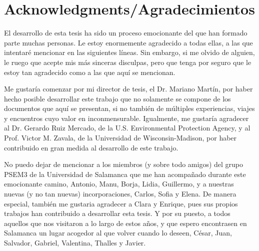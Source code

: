



\bigskip

\begingroup
\let\clearpage\relax
\let\cleardoublepage\relax
\let\cleardoublepage\relax
\chapter*{Acknowledgments/Agradecimientos}
El desarrollo de esta tesis ha sido un proceso emocionante del que han formado parte muchas personas. Le estoy enormemente agradecido a todas ellas, a las que intentaré mencionar en las siguientes l\'{i}neas. Sin embargo, si me olvido de alguien, le ruego que acepte mis m\'{a}s sinceras disculpas, pero que tenga por seguro que le estoy tan agradecido como a las que aquí se mencionan.

Me gustaría comenzar por mi director de tesis, el Dr. Mariano Martín, por haber hecho posible desarrollar este trabajo que no solamente se compone de los documentos que aqu\'{i} se presentan, si no también de m\'{u}ltiples experiencias, viajes y encuentros cuyo valor en inconmensurable. Igualmente, me gustaría agradecer al Dr. Gerardo Ruiz Mercado, de la U.S. Environmental Protection Agency, y al Prof. Victor M. Zavala, de la Universidad de Wisconsin-Madison, por haber contribuido en gran medida al desarrollo de este trabajo.

No puedo dejar de mencionar a los miembros (y sobre todo amigos) del grupo PSEM3 de la Universidad de Salamanca que me han acompañado durante este emocionante camino, Antonio, Manu, Borja, Lidia, Guillermo, y a nuestras nuevas (y no tan nuevas) incorporaciones, Carlos, Sofia y Elena. De manera especial, tambi\'{e}n me gustaria agradecer a Clara y Enrique, pues sus propios trabajos han contribuido a desarrollar esta tesis. Y por su puesto, a todos aquellos que nos visitaron a lo largo de estos años, y que espero encontrasen en Salamanca un lugar acogedor al que volver cuando lo deseen, César, Juan, Salvador, Gabriel, Valentina, Thalles y Javier.

